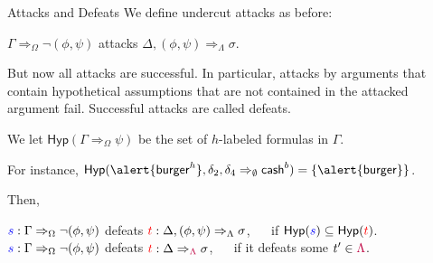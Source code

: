 \documentclass[aspectratio=169]{beamer}
\begin{document}
\def\Hyp{\mathsf{Hyp}}
\begin{frame}{Attacks and Defeats}
    We define undercut attacks as before: 
    \begin{center}$\Gamma \Rightarrow_\Omega \neg(\phi,\psi)$ \alert{attacks} $\Delta, (\phi,\psi) \Rightarrow_{\Lambda} \sigma$.
    \end{center}
    \pause

    But now all attacks are successful. In particular, attacks by arguments that contain hypothetical assumptions that are not contained in the attacked argument fail. Successful attacks are called \alert{defeats}. 
    \pause
    
    We let \alert{$\Hyp(\Gamma \Rightarrow_\Omega \psi)$} be the set of $h$-labeled formulas in $\Gamma$.

    For instance, $\Hyp(\alert{\mathsf{burger}^h}, \delta_2, \delta_4 \Rightarrow_\emptyset \mathsf{cash}^b) = \{ \alert{\mathsf{burger}} \}$.

    \pause

    Then, 
    \begin{center} ${\color{blue}s} : \Gamma \Rightarrow_\Omega \neg(\phi,\psi)$ \alert{defeats} ${\color{red}t} : \Delta, (\phi,\psi) \Rightarrow_\Lambda \sigma$, ~~ if $\Hyp({\color{blue}s}) 
    \subseteq \Hyp({\color{red}t})$. \\ \pause
    ${\color{blue}s} : \Gamma \Rightarrow_\Omega \neg(\phi,\psi)$ \alert{defeats} ${\color{red} t}: \Delta \Rightarrow_{\color{purple}\Lambda} \sigma$, ~~ if it defeats some $t' \in {\color{purple}\Lambda}$.
    \end{center}
\end{frame}

\end{document}
